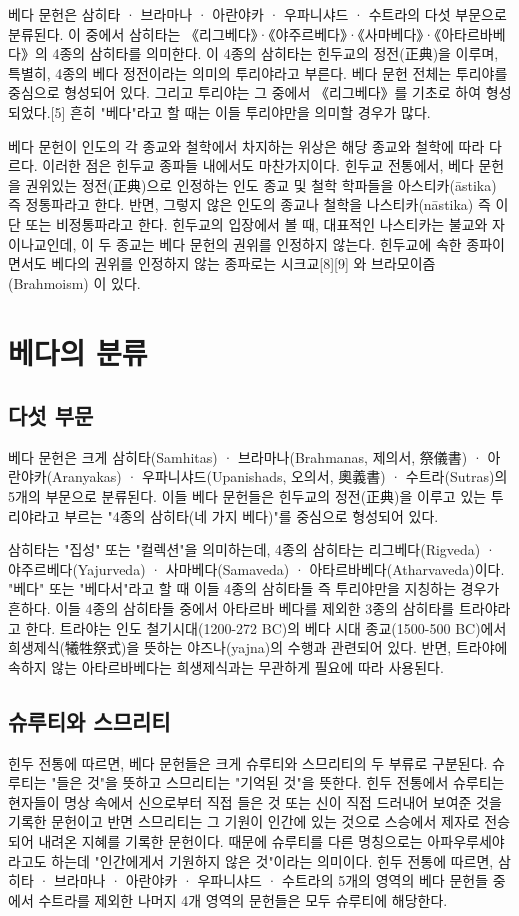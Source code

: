 \documentclass[12pt, a4paper, oneside]{book}
\let\stdsection\section
\renewcommand\section{\newpage\stdsection}
\begin{document}
	베다 문헌은 삼히타 · 브라마나 · 아란야카 · 우파니샤드 · 수트라의 다섯 부문으로 분류된다. 이 중에서 삼히타는 《리그베다》·《야주르베다》·《사마베다》·《아타르바베다》의 4종의 삼히타를 의미한다. 이 4종의 삼히타는 힌두교의 정전(正典)을 이루며, 특별히, 4종의 베다 정전이라는 의미의 투리야라고 부른다. 베다 문헌 전체는 투리야를 중심으로 형성되어 있다. 그리고 투리야는 그 중에서 《리그베다》를 기초로 하여 형성되었다.[5] 흔히 "베다"라고 할 때는 이들 투리야만을 의미할 경우가 많다.

베다 문헌이 인도의 각 종교와 철학에서 차지하는 위상은 해당 종교와 철학에 따라 다르다. 
이러한 점은 힌두교 종파들 내에서도 마찬가지이다. 
힌두교 전통에서, 베다 문헌을 권위있는 정전(正典)으로 인정하는 인도 종교 및 철학 학파들을 아스티카(āstika) 즉 정통파라고 한다. 
반면, 그렇지 않은 인도의 종교나 철학을 나스티카(nāstika) 즉 이단 또는 비정통파라고 한다. 
힌두교의 입장에서 볼 때, 대표적인 나스티카는 불교와 자이나교인데, 이 두 종교는 베다 문헌의 권위를 인정하지 않는다.
힌두교에 속한 종파이면서도 베다의 권위를 인정하지 않는 종파로는 시크교[8][9] 와 브라모이즘(Brahmoism) 이 있다.




\section{베다의 분류}


\subsection{다섯 부문}
베다 문헌은 크게 삼히타(Samhitas) · 브라마나(Brahmanas, 제의서, 祭儀書) · 아란야카(Aranyakas) · 우파니샤드(Upanishads, 오의서, 奧義書) · 수트라(Sutras)의 5개의 부문으로 분류된다. 이들 베다 문헌들은 힌두교의 정전(正典)을 이루고 있는 투리야라고 부르는 "4종의 삼히타(네 가지 베다)"를 중심으로 형성되어 있다.

삼히타는 "집성" 또는 "컬렉션"을 의미하는데, 4종의 삼히타는 리그베다(Rigveda) · 야주르베다(Yajurveda) · 사마베다(Samaveda) · 아타르바베다(Atharvaveda)이다. "베다" 또는 "베다서"라고 할 때 이들 4종의 삼히타들 즉 투리야만을 지칭하는 경우가 흔하다. 
이들 4종의 삼히타들 중에서 아타르바 베다를 제외한 3종의 삼히타를 트라야라고 한다. 
트라야는 인도 철기시대(1200-272 BC)의 베다 시대 종교(1500-500 BC)에서 희생제식(犧牲祭式)을 뜻하는 야즈나(yajna)의 수행과 관련되어 있다. 
반면, 트라야에 속하지 않는 아타르바베다는 희생제식과는 무관하게 필요에 따라 사용된다.

\subsection{슈루티와 스므리티}
힌두 전통에 따르면, 베다 문헌들은 크게 슈루티와 스므리티의 두 부류로 구분된다. 
슈루티는 "들은 것"을 뜻하고 스므리티는 "기억된 것"을 뜻한다. 
힌두 전통에서 슈루티는 현자들이 명상 속에서 신으로부터 직접 들은 것 또는 신이 직접 드러내어 보여준 것을 기록한 문헌이고 반면 스므리티는 그 기원이 인간에 있는 것으로 스승에서 제자로 전승되어 내려온 지혜를 기록한 문헌이다. 
때문에 슈루티를 다른 명칭으로는 아파우루세야라고도 하는데 "인간에게서 기원하지 않은 것"이라는 의미이다. 
힌두 전통에 따르면, 삼히타 · 브라마나 · 아란야카 · 우파니샤드 · 수트라의 5개의 영역의 베다 문헌들 중에서 수트라를 제외한 나머지 4개 영역의 문헌들은 모두 슈루티에 해당한다.
\end{document}
